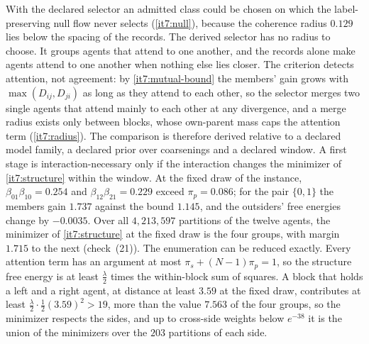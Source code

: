 \documentclass[11pt,letterpaper]{report}
\begin{document}
With the declared selector an admitted class could be chosen on which the label-preserving null flow never selects (\cref{it7:null}), because the coherence radius $0.129$ lies below the spacing of the records. The derived selector has no radius to choose. It groups agents that attend to one another, and the records alone make agents attend to one another when nothing else lies closer. The criterion detects attention, not agreement: by \cref{it7:mutual-bound} the members' gain grows with $\max(D_{ij},D_{ji})$ as long as they attend to each other, so the selector merges two single agents that attend mainly to each other at any divergence, and a merge radius exists only between blocks, whose own-parent mass caps the attention term (\cref{it7:radius}). The comparison is therefore derived relative to a declared model family, a declared prior over coarsenings and a declared window. A first stage is interaction-necessary only if the interaction changes the minimizer of \cref{it7:structure} within the window. At the fixed draw of the instance, $\beta_{01}\beta_{10}=0.254$ and $\beta_{12}\beta_{21}=0.229$ exceed $\pi_p=0.086$; for the pair $\{0,1\}$ the members gain $1.737$ against the bound $1.145$, and the outsiders' free energies change by $-0.0035$. Over all $4{,}213{,}597$ partitions of the twelve agents, the minimizer of \cref{it7:structure} at the fixed draw is the four groups, with margin $1.715$ to the next (check~(21)). The enumeration can be reduced exactly. Every attention term has an argument at most $\pi_s+(N-1)\pi_p=1$, so the structure free energy is at least $\frac\lambda2$ times the within-block sum of squares. A block that holds a left and a right agent, at distance at least $3.59$ at the fixed draw, contributes at least $\frac\lambda2\cdot\frac12(3.59)^2>19$, more than the value $7.563$ of the four groups, so the minimizer respects the sides, and up to cross-side weights below $e^{-38}$ it is the union of the minimizers over the $203$ partitions of each side.
\end{document}
